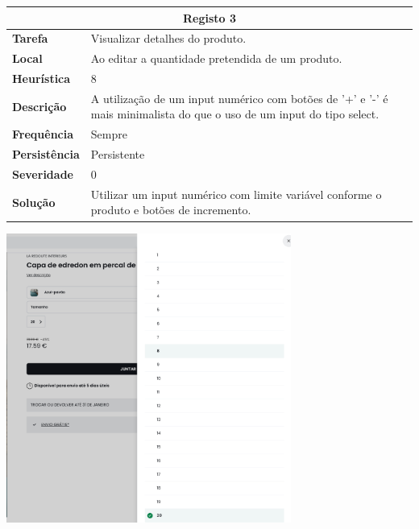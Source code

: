 \documentclass[a4paper,12pt]{article}
\begin{document}
\begin{center}
    \begin{table}[h!]
        \centering
        \begin{tabular}{|m{3cm}|m{12cm}|}
        \hline
        \multicolumn{2}{|c|}{\textbf{Registo 3}} \\ \hline
        \textbf{Tarefa}       & Visualizar detalhes do produto. \\ \hline
        \textbf{Local}        & Ao editar a quantidade pretendida de um produto. \\ \hline
        \textbf{Heurística}   & 8 \\ \hline
        \textbf{Descrição}    & A utilização de um input numérico com botões de '+' e '-' é mais minimalista do que o uso de um input do tipo select. \\ \hline
        \textbf{Frequência}   & Sempre \\ \hline
        \textbf{Persistência} & Persistente \\ \hline
        \textbf{Severidade}   & 0 \\ \hline
        \textbf{Solução}      & Utilizar um input numérico com limite variável conforme o produto e botões de incremento.\\ \hline
        \end{tabular}
    \end{table}
    \vspace{0.5cm}
    \includegraphics[width=0.7\textwidth]{heuristics/02input_quantidade.png}


\end{center}
\end{document}
